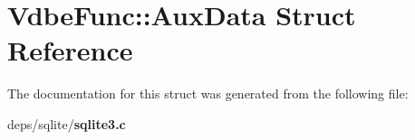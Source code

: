 \section{Vdbe\-Func::Aux\-Data Struct Reference}
\label{structVdbeFunc_1_1AuxData}


The documentation for this struct was generated from the following file:\begin{CompactItemize}
\item 
deps/sqlite/\bf{sqlite3.c}\end{CompactItemize}
